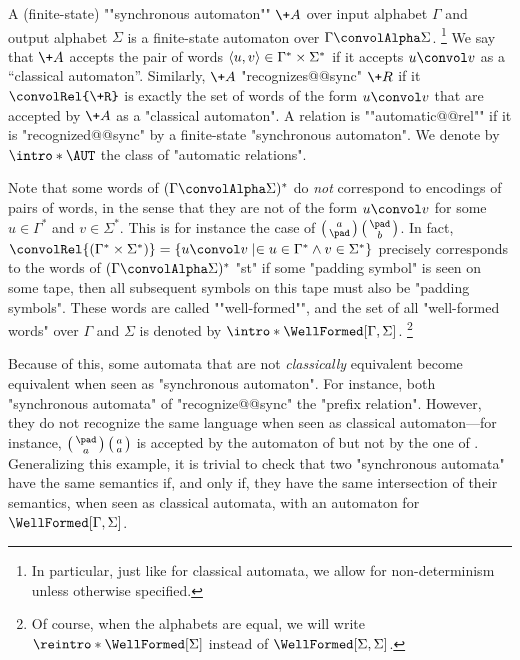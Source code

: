 A (finite-state) \AP""synchronous automaton"" $\+A$ over input alphabet $\Gamma$ and output alphabet $\Sigma$
is a finite-state automaton over $\Gamma\convolAlpha \Sigma$.%
\footnote{In particular, just like for classical automata, we allow for non-determinism
unless otherwise specified.}
We say that $\+A$ accepts the pair of words $\langle u,v\rangle \in \Gamma^* \times \Sigma^*$ if
it accepts $u \convol v$ as a ``classical automaton''. Similarly, $\+A$ "recognizes@@sync"
$\+R$ if it $\convolRel{\+R}$ is exactly the set of
words of the form $u \convol v$ that are accepted by $\+A$ as a "classical automaton".
A relation is \AP""automatic@@rel"" if it is "recognized@@sync" by a finite-state "synchronous automaton".
We denote by \AP$\intro*\AUT$ the class of "automatic relations".

\begin{remark}
	Note that some words of $(\Gamma\convolAlpha \Sigma)^*$ do \emph{not} correspond to
	encodings of pairs of words, in the sense that they are not of the
	form $u \convol v$ for some $u \in \Gamma^*$ and $v\in \Sigma^*$. 
	This is for instance the case of $\pair{a}{\pad}\pair{\pad}{b}$.
	In fact, $\convolRel{(\Gamma^*\times\Sigma^*)} =
	\{u \convol v \mid \in u \in \Gamma^* \land v\in \Sigma^* \}$ precisely corresponds to
	the words of $(\Gamma\convolAlpha \Sigma)^*$ "st" if some "padding symbol" is seen
	on some tape, then all subsequent symbols on this tape must also be "padding symbols".
	These words are called \AP""well-formed"", and the set of all "well-formed words" over
	$\Gamma$ and $\Sigma$ is denoted by \AP$\intro*\WellFormed[\Gamma,\Sigma]$.%
	\footnote{Of course, when the alphabets are equal, we will write
	$\reintro*\WellFormed[\Sigma]$ instead of $\WellFormed[\Sigma,\Sigma]$.}
\end{remark}

Because of this, some automata that are not \emph{classically} equivalent
become equivalent when seen as "synchronous automaton". For instance, 
both "synchronous automata" of
"recognize@@sync" the "prefix relation". However, they do not recognize
the same language when seen as classical automaton---for instance, $\pair{\pad}{a}\pair{a}{a}$
is accepted by the automaton of 
but not by the one of .
Generalizing this example, it is trivial to check that two "synchronous automata"
have the same semantics if, and only if, they have the same
intersection of their semantics, when seen as classical automata, with
an automaton for $\WellFormed[\Gamma,\Sigma]$.

